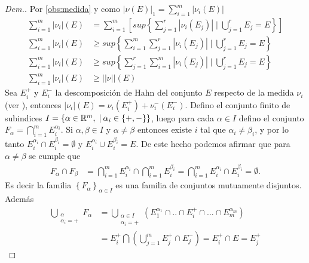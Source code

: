 \begin{proof}[Dem.]
    Por  \eqref{obs:medida} y como $\displaystyle|\nu(E)|_1= \sum_{i=1}^{m}|\nu_i(E)|$
    \begin{equation*}
    \begin{split}
       \sum_{i=1}^{m} |\nu_i|(E)&=\sum_{i=1}^{m} \left[sup\left\{ \sum_{j=1}^r |\nu_i(E_j)| \mid \bigcup_{j=1}^rE_j=E\right\} \right]\\
       \sum_{i=1}^{m} |\nu_i|(E) &\geq sup\left\{ \sum_{i=1}^{m} \sum_{j=1}^r |\nu_i(E_j)| \mid \bigcup_{j=1}^rE_j=E \right\}\\
       \sum_{i=1}^{m} |\nu_i|(E) &\geq sup\left\{  \sum_{j=1}^r \sum_{i=1}^{m} |\nu_i(E_j)| \mid \bigcup_{j=1}^rE_j=E \right\}\\
       \sum_{i=1}^{m} |\nu_i|(E) &\geq ||\nu||(E)
    \end{split}
    \end{equation*}
Sea $E_i^{+}$ y $E_i^-$  la descomposición de Hahn del conjunto $E$ respecto de la medida $\nu_i$ (ver \cite{folland}), entonces $|\nu_i|(E)=\nu_i(E_i^+)+\nu_i^-(E_i^-)$.    Defino el conjunto finito de subindices  $I=\{\alpha\in\mathbb{R}^m,  \; | \: \alpha_i\in\{+,-\} \}$, luego para cada $\alpha\in I$ defino el conjunto $F_\alpha=\displaystyle\bigcap_{i=1}^mE_i^{\alpha_i}$. Si $\alpha,\beta\in I$ y $\alpha\neq\beta$ entonces existe $i$ tal que  $\alpha_i\neq\beta_i$,  y por lo tanto $E_i^{\alpha_i}\cap E_i^{\beta_i}=\emptyset$ y $E_i^{\alpha_i}\cup E_i^{\beta_i}=E$. De este hecho  podemos afirmar que para  $\alpha\neq\beta$ se cumple que
  \begin{equation*}
  	\begin{split}
  		F_\alpha\cap F_\beta&=\bigcap_{i=1}^mE_i^{\alpha_i}\cap \bigcap_{i=1}^mE_i^{\beta_i}=\bigcap_{i=1}^mE_i^{\alpha_i}\cap E_i^{\beta_i}=\emptyset.
  	\end{split}
  \end{equation*}
  Es decir la familia $\left\lbrace F_\alpha\right\rbrace _{\alpha\in I}$ es una familia de conjuntos mutuamente disjuntos.  Además
  \begin{equation*}
      \begin{split}
        \bigcup_{\substack{\alpha\\ \alpha_i=+}}F_\alpha&=\bigcup_{\substack{\alpha\in I\\ \alpha_i=+}}\left( E_1^{\alpha_1}\cap..\cap  E_i^+\cap...\cap E_m^{\alpha_m} \right)\\
        &=E_i^+\bigcap \left(\bigcup_{j=1}^m E_j^+\cap E_j^- \right)=E_i^+\cap E=E_j^+
      \end{split}
  \end{equation*}
  

\end{proof}
